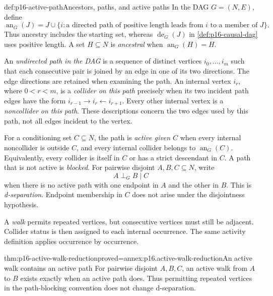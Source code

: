 \begin{hbdefinition}{def:p16-active-path}{Ancestors, paths, and active paths}
In the DAG \(G=(N,E)\), define
\[
 \operatorname{an}_G(J)=J\cup
 \{i:\text{a directed path of positive length leads from }i
                                  \text{ to a member of }J\}.
\]
Thus ancestry includes the starting set, whereas
\(\operatorname{de}_G(J)\) in \cref{def:p16-causal-dag} uses
positive length. A set \(H\subseteq N\) is \emph{ancestral} when
\(\operatorname{an}_G(H)=H\).

An \emph{undirected path in the DAG} is a sequence of distinct vertices
\(i_0,\ldots,i_m\) such that each consecutive pair is joined by an
edge in one of its two directions. The edge directions are retained
when examining the path. An internal vertex \(i_r\), where
\(0<r<m\), is a \emph{collider on this path} precisely when its two
incident path edges have the form
\(i_{r-1}\to i_r\leftarrow i_{r+1}\). Every other internal
vertex is a \emph{noncollider on this path}. These descriptions concern
the two edges used by this path, not all edges incident to the vertex.

For a conditioning set \(C\subseteq N\), the path is
\emph{active given \(C\)} when every internal noncollider is outside
\(C\), and every internal collider belongs to
\(\operatorname{an}_G(C)\). Equivalently, every collider is itself
in \(C\) or has a strict descendant in \(C\). A path that is not
active is \emph{blocked}. For pairwise disjoint \(A,B,C\subseteq N\),
write
\[
 A\mathrel{\perp_G}B\mid C
\]
when there is no active path with one endpoint in \(A\) and the
other in \(B\). This is \emph{d-separation}. Endpoint membership
in \(C\) does not arise under the disjointness hypothesis.

A \emph{walk} permits repeated vertices, but consecutive vertices must
still be adjacent. Collider status is then assigned to each internal
occurrence. The same activity definition applies occurrence by occurrence.
\end{hbdefinition}

\begin{hblemma}{thm:p16-active-walk-reduction}{proved=annex:p16.active-walk-reduction}{An active walk contains an active path}
For pairwise disjoint \(A,B,C\), an active walk from \(A\) to
\(B\) exists exactly when an active path does. Thus permitting
repeated vertices in the path-blocking convention does not change
d-separation.
\end{hblemma}

